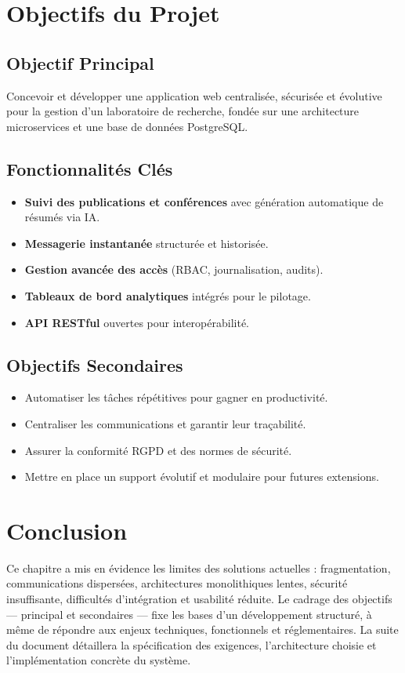 \documentclass[12pt]{rapportPfe}
\begin{document}
\section{Objectifs du Projet}

\subsection{Objectif Principal}
Concevoir et développer une application web centralisée, sécurisée et évolutive pour la gestion d’un laboratoire de recherche, fondée sur une architecture microservices et une base de données PostgreSQL.

\subsection{Fonctionnalités Clés}
\begin{itemize}[itemsep=0.8em]
  \item \textbf{Suivi des publications et conférences} avec génération automatique de résumés via IA.
  \item \textbf{Messagerie instantanée} structurée et historisée.
  \item \textbf{Gestion avancée des accès} (RBAC, journalisation, audits).
  \item \textbf{Tableaux de bord analytiques} intégrés pour le pilotage.
  \item \textbf{API RESTful} ouvertes pour interopérabilité.
\end{itemize}

\subsection{Objectifs Secondaires}
\begin{itemize}[itemsep=0.8em]
  \item Automatiser les tâches répétitives pour gagner en productivité.
  \item Centraliser les communications et garantir leur traçabilité.
  \item Assurer la conformité RGPD et des normes de sécurité.
  \item Mettre en place un support évolutif et modulaire pour futures extensions.
\end{itemize}

\section{Conclusion}
Ce chapitre a mis en évidence les limites des solutions actuelles : fragmentation, communications dispersées, architectures monolithiques lentes, sécurité insuffisante, difficultés d’intégration et usabilité réduite. Le cadrage des objectifs — principal et secondaires — fixe les bases d’un développement structuré, à même de répondre aux enjeux techniques, fonctionnels et réglementaires. La suite du document détaillera la spécification des exigences, l’architecture choisie et l’implémentation concrète du système.
\end{document}
